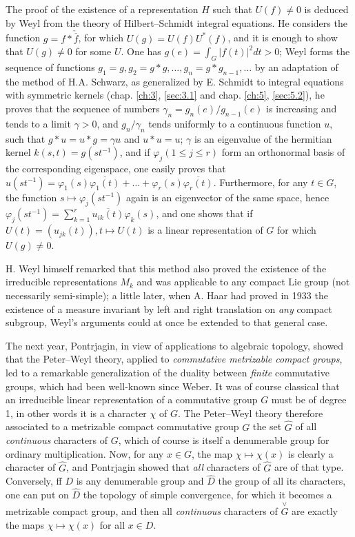 \documentclass[12pt,a4paper,leqno,twoside]{extbook}
\begin{document}
The proof of the existence of a representation \(H\) such that \(U(f) \neq 0\) is deduced by Weyl from the theory of Hilbert--Schmidt integral equations. He considers the function \(g = f * \check{\overline{f}}\), for which \(U(g) = U(f)U^*(f)\), and it is enough to show that \(U(g) \neq 0\) for some \(U\). One has \(g(e) = \int_G |f(t)|^2 dt > 0\); Weyl forms the sequence of functions \(g_1 = g, g_2 = g*g, \ldots, g_n = g*g_{n-1}, \ldots\) by an adaptation of the method of H.A. Schwarz, as generalized by E. Schmidt to integral equations with symmetric kernels (chap. \ref{ch:3}, \ref{sec:3.1} and chap. \ref{ch:5}, \ref{sec:5.2}), he proves that the sequence of numbers \(\gamma_n = g_n(e)/g_{n-1}(e)\) is increasing and tends to a limit \(\gamma > 0\), and \(g_n/\gamma_n\) tends uniformly to a continuous function \(u\), such that \(g*u = u*g = \gamma u\) and \(u*u = u\); \(\gamma\) is an eigenvalue of the hermitian kernel \(k(s,t) = g(st^{-1})\), and if \(\varphi_j (1 \leq j \leq r)\) form an orthonormal basis of the corresponding eigenspace, one easily proves that \(u(st^{-1}) = \varphi_1(s) \overline{\varphi_1(t)} + \ldots + \varphi_r(s)\overline{\varphi_r(t)}\). Furthermore, for any \(t \in G\), the function \(s \mapsto \varphi_j(st^{-1})\) again is an eigenvector of the same space, hence \(\varphi_j(st^{-1}) = \sum\limits_{k=1}^r \overline{u_{ik}(t)}\varphi_k(s)\), and one shows that if \(U(t) = (u_{jk}(t)), t \mapsto U(t)\) is a linear representation of \(G\) for which \(U(g) \neq 0\).

H. Weyl himself remarked that this method also proved the existence of the irreducible representations \(M_k\) and was applicable to any compact Lie group (not necessarily semi-simple); a little later, when A. Haar had proved in 1933 the existence of a measure invariant by left and right translation on \emph{any} compact subgroup, Weyl's arguments could at once be extended to that general case.

The next year, Pontrjagin, in view of applications to algebraic topology, showed that the Peter--Weyl theory, applied to \emph{commutative metrizable compact groups}, led to a remarkable generalization of the duality between \emph{finite} commutative groups, which had been well-known since Weber. It was of course classical that an irreducible linear representation of a commutative group \(G\) must be of degree 1, in other words it is a character \(\chi\) of \(G\). The Peter--Weyl theory therefore associated to a metrizable compact commutative group \(G\) the set \(\hat{G}\) of all \emph{continuous} characters of \(G\), which of course is itself a denumerable group for ordinary multiplication. Now, for any \(x \in G\), the map \(\chi \mapsto \chi(x)\) is clearly a character of \(\hat{G}\), and Pontrjagin showed that \emph{all} characters of \(\hat{G}\) are of that type. Conversely, ff \(D\) is any denumerable group and \(\hat{D}\) the group of all its characters, one can put on \(\hat{D}\) the topology of simple convergence, for which it becomes a metrizable compact group, and then all \emph{continuous} characters of \(\stackrel{\vee}{G}\) are exactly the maps \(\chi \mapsto \chi(x)\) for all \(x \in D\).
\end{document}
